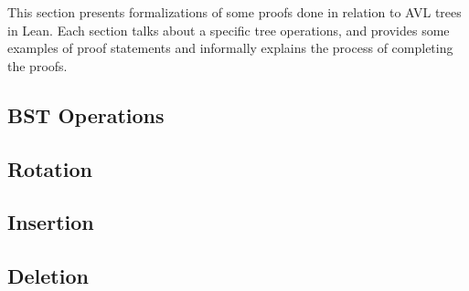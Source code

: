 This section presents formalizations of some proofs done in relation to AVL trees in Lean. Each section talks about a specific tree operations, and provides some examples of proof statements and informally explains the process of completing the proofs.

\subsection{BST Operations}


\subsection{Rotation}


\subsection{Insertion}


\subsection{Deletion}
